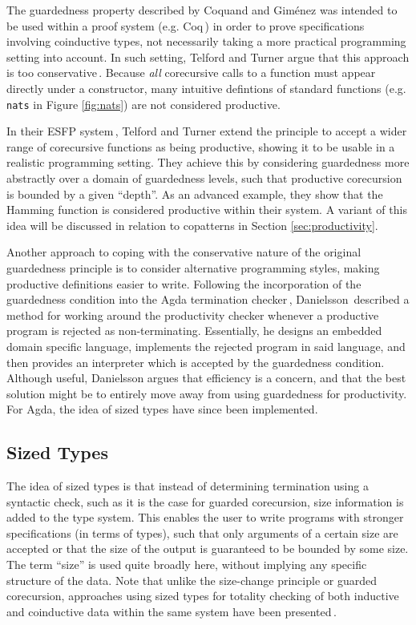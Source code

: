 The guardedness property described by Coquand and Gim\'{e}nez was intended to be used within a proof system (e.g. Coq\,\citep{Coq:manual}) in order to prove specifications involving coinductive types, not necessarily taking a more practical programming setting into account. In such setting, Telford and Turner argue that this approach is too conservative\,\citep{Telford98ensuringthe}. Because \emph{all} corecursive calls to a function must appear directly under a constructor, many intuitive defintions of standard functions (e.g. \texttt{nats} in Figure \ref{fig:nats}) are not considered productive.

In their ESFP system\,\citep{Telford97ensuringstreams,Telford98ensuringthe}, Telford and Turner extend the principle to accept a wider range of corecursive functions as being productive, showing it to be usable in a realistic programming setting. They achieve this by considering guardedness more abstractly over a domain of guardedness levels, such that productive corecursion is bounded by a given ``depth''. As an advanced example, they show that the Hamming function is considered productive within their system. A variant of this idea will be discussed in relation to copatterns in Section \ref{sec:productivity}.

Another approach to coping with the conservative nature of the original guardedness principle is to consider alternative programming styles, making productive definitions easier to write. Following the incorporation of the guardedness condition into the Agda termination checker\,\citep{AltenkirchNAD10}, Danielsson\,\citep{Danielsson10beatingthe} described a method for working around the productivity checker whenever a productive program is rejected as non-terminating. Essentially, he designs an embedded domain specific language, implements the rejected program in said language, and then provides an interpreter which is accepted by the guardedness condition. Although useful, Danielsson argues that efficiency is a concern, and that the best solution might be to entirely move away from using guardedness for productivity. For Agda, the idea of sized types have since been implemented.


\subsection{Sized Types}
\label{sec:sized_types}
The idea of sized types is that instead of determining termination using a syntactic check, such as it is the case for guarded corecursion, size information is added to the type system. This enables the user to write programs with stronger specifications (in terms of types), such that only  arguments of a certain size are accepted or that the size of the output is guaranteed to be bounded by some size. The term ``size'' is used quite broadly here, without implying any specific structure of the data. Note that unlike the size-change principle or guarded corecursion, approaches using sized types for totality checking of both inductive and coinductive data within the same system have been presented\,\citep{Abel13Wellfounded}.

